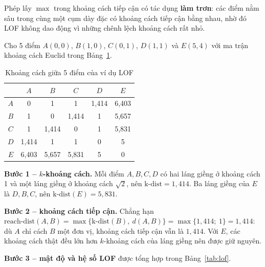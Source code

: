 Phép lấy $\max$ trong khoảng cách tiếp cận có tác dụng \textbf{làm trơn}: các điểm nằm sâu trong cùng một cụm dày đặc có khoảng cách tiếp cận bằng nhau, nhờ đó LOF không dao động vì những chênh lệch khoảng cách rất nhỏ.

\begin{example}[Tính tay LOF với $k = 3$]
Cho 5 điểm $A(0, 0)$, $B(1, 0)$, $C(0, 1)$, $D(1, 1)$ và $E(5, 4)$ với ma trận khoảng cách Euclid trong Bảng~\ref{tab:lof-dist}.
\end{example}

\begin{table}[H]
\centering
\begin{tabular}{|c|c|c|c|c|c|}
\hline
 & $A$ & $B$ & $C$ & $D$ & $E$ \\
\hline
$A$ & 0 & 1 & 1 & 1,414 & 6,403 \\ \hline
$B$ & 1 & 0 & 1,414 & 1 & 5,657 \\ \hline
$C$ & 1 & 1,414 & 0 & 1 & 5,831 \\ \hline
$D$ & 1,414 & 1 & 1 & 0 & 5 \\ \hline
$E$ & 6,403 & 5,657 & 5,831 & 5 & 0 \\ \hline
\end{tabular}
\caption{Khoảng cách giữa 5 điểm của ví dụ LOF}
\label{tab:lof-dist}
\end{table}

\noindent\textbf{Bước 1 -- $k$-khoảng cách.} Mỗi điểm $A, B, C, D$ có hai láng giềng ở khoảng cách 1 và một láng giềng ở khoảng cách $\sqrt{2}$, nên $\text{k-dist} = 1{,}414$. Ba láng giềng của $E$ là $D, B, C$, nên $\text{k-dist}(E) = 5{,}831$.

\noindent\textbf{Bước 2 -- khoảng cách tiếp cận.} Chẳng hạn $\text{reach-dist}(A, B) = \max\{\text{k-dist}(B),\ d(A, B)\} = \max\{1{,}414;\ 1\} = 1{,}414$: dù $A$ chỉ cách $B$ một đơn vị, khoảng cách tiếp cận vẫn là $1{,}414$. Với $E$, các khoảng cách thật đều lớn hơn $k$-khoảng cách của láng giềng nên được giữ nguyên.

\noindent\textbf{Bước 3 -- mật độ và hệ số LOF} được tổng hợp trong Bảng~\ref{tab:lof}.

